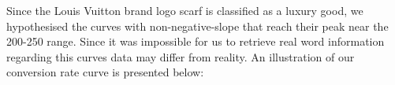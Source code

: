Since the Louis Vuitton brand logo scarf is classified as a luxury good, we hypothesised the curves with non-negative-slope that reach their peak near the 200-250 \EUR{} range. Since it was impossible for us to retrieve real word information regarding this curves data may differ from reality. An illustration of our conversion rate curve is presented below:\newline
{} 
\clearpage